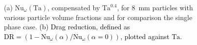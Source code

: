 \documentclass{jfm}
\newcommand\Nus{\text{Nu}}
\newcommand\Tay{\text{Ta}}
\newcommand{\red}[1]{\textcolor{black}{#1}}
\begin{document}
\begin{figure}
\centering%
%
%
\caption{%
(a) $\Nus_\omega (\Tay)$, compensated by $\Tay^{0.4}$, for
\SI{8}{\milli\metre} particles with various particle volume fractions and for
comparison the single phase case.  \red{(b) Drag reduction, defined as
$\text{DR} = \left(1 - \Nus_\omega(\alpha) / \Nus_\omega(\alpha=0) \right)$,
plotted against $\Tay$.}
}
\label{fig:dragReductionVF}
\end{figure}
\end{document}

